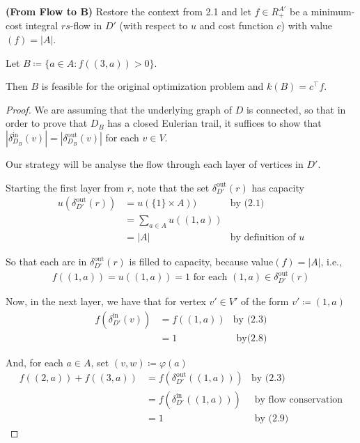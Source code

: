 \documentclass[a4paper,10pt, leqno]{article}
\theoremstyle{definition}
\begin{document}
\begin{theorem}{\textbf{(From Flow to B)}}
Restore the context from 2.1 and let $f \in R_+^{A'}$ be a minimum-cost integral $rs$-flow in $D'$ (with respect to $u$ and cost function $c$) with value$(f) = |A|$.

Let $B \coloneqq \{a \in A : f((3, a)) > 0\}$.

Then $B$ is feasible for the original optimization problem and $k(B) = c^\intercal f$.
\end{theorem}
\begin{proof}
We are assuming that the underlying graph of $D$ is connected, so that in order to prove that $D_B$ has a closed Eulerian trail, it suffices to show that $|\delta_{D_B}^\text{in}(v)| = |\delta_{D_B}^\text{out}(v)|$ for each $v \in V$.

Our strategy will be analyse the flow through each layer of vertices in $D'$.

Starting the first layer from $r$, note that the set $\delta_{D'}^\text{out}(r)$ has capacity
\begin{align*}
 u(\delta_{D'}^\text{out}(r)) &= u(\{1\} \times A)) &\text{by (2.1)} \\
 &= \sum_{a \in A}{u((1, a))} \\
 &= |A| &\text{by definition of }u
\end{align*}

So that each arc in $\delta_{D'}^\text{out}(r)$ is filled to capacity, because value$(f) = |A|$, i.e.,
\begin{align*}
 \tag{2.8}
 f((1, a)) = u((1, a)) = 1 \text{ for each } (1, a) \in \delta_{D'}^\text{out}(r)
\end{align*}

Now, in the next layer, we have that for vertex $v' \in V'$ of the form $v' \coloneqq (1, a)$
\begin{align*}
\tag{2.9}
 f(\delta_{D'}^\text{in}(v)) &= f((1, a)) &\text{by (2.3)}\\
 &= 1 &\text{ by(2.8)}
\end{align*}

And, for each $a \in A$, set $(v, w) \coloneqq \varphi(a)$
\begin{align*}
 f((2, a)) + f((3, a)) &= f(\delta_{D'}^\text{out}((1, a))) &\text{by (2.3)}\\
 &= f(\delta_{D'}^\text{in}((1, a))) &\text{ by flow conservation} \\
 &= 1 &\text{ by (2.9)}
\end{align*}


\end{proof}
\end{document}
